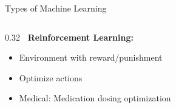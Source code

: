 \documentclass[aspectratio=169, 10pt]{beamer}
\begin{document}
\begin{frame}{Types of Machine Learning}
\begin{columns}
        \begin{column}{0.32\textwidth}
            \textbf{\faTrophy\ Reinforcement Learning:}
            \begin{itemize}
                \item Environment with reward/punishment
                \item Optimize actions
                \item Medical: Medication dosing optimization
            \end{itemize}

            \vspace{2mm}
            \begin{center}
            \end{center}
        \end{column}
    \end{columns}

\end{frame}
\end{document}
